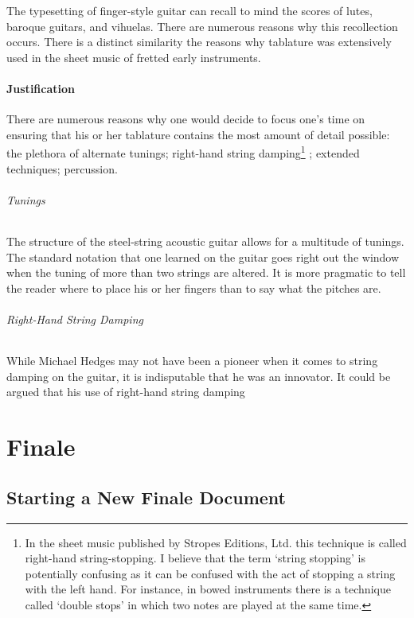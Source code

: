 \documentclass[]{memoir}
\begin{document}
The typesetting of finger-style guitar can recall to mind the scores
of lutes, baroque guitars, and vihuelas. There are numerous reasons
why this recollection occurs. There is a distinct similarity the
reasons why tablature was extensively used in the sheet music of
fretted early instruments.

\subsection{Justification}
\label{sec:justification}

There are numerous reasons why one would decide to focus one's time on
ensuring that his or her tablature contains the most amount of detail
possible: the plethora of alternate tunings; right-hand string
damping\footnote{In the sheet music published by Stropes Editions, Ltd. this technique is called right-hand string-stopping. I believe that the term `string stopping' is potentially confusing as it can be confused with the act of stopping a string with the left hand. For instance, in bowed instruments there is a technique called `double stops' in which two notes are played at the same time.} ; extended techniques; percussion.
\paragraph{Tunings}

The structure of the steel-string acoustic guitar allows for a
multitude of tunings. The standard notation that one learned on the
guitar goes right out the window when the tuning of more than two
strings are altered. It is more pragmatic to tell the reader where to
place his or her fingers than to say what the pitches are.

\paragraph{Right-Hand String Damping}

While Michael Hedges may not have been a pioneer when it comes to
string damping on the guitar, it is indisputable that he was an
innovator. It could be argued that his use of right-hand string damping

\part{Finale}
\chapter{Starting a New Finale Document}
\label{cha:start-new-docum}
\end{document}
